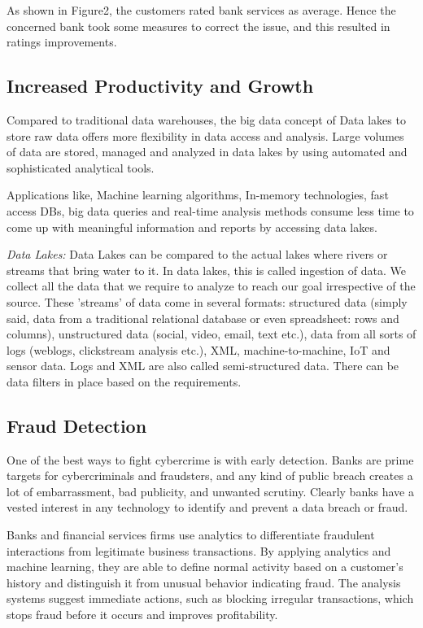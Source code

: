 \documentclass[sigconf]{acmart}
\begin{document}
As shown in Figure2, the customers rated bank services as average. Hence the concerned bank took some measures to correct the issue, and this resulted in ratings improvements.

\subsection{Increased Productivity and Growth}
Compared to traditional data warehouses, the big data concept of Data lakes to store raw data offers more flexibility in data access and analysis. Large volumes of data are stored, managed and analyzed in data lakes  by using automated and sophisticated analytical tools. 

Applications like, Machine learning algorithms, In-memory technologies, fast access DBs, big data queries and real-time analysis methods consume less time to come up with meaningful information and reports by accessing data lakes.

\textit{Data Lakes:} Data Lakes can be compared to the actual lakes where rivers or streams that bring water to it. In data lakes, this is called ingestion of data. We collect all the data that we require to analyze to reach our goal irrespective of the source. These 'streams' of data come in several formats: structured data (simply said, data from a traditional relational database or even spreadsheet: rows and columns), unstructured data (social, video, email, text etc.), data from all sorts of logs (weblogs, clickstream analysis etc.), XML, machine-to-machine, IoT and sensor data. Logs and XML are also called semi-structured data. There can be data filters in place based on the requirements\cite{data-lakes}.

\subsection{Fraud Detection}
One of the best ways to fight cybercrime is with early detection. Banks are prime targets for cybercriminals and fraudsters, and any kind of public breach creates a lot of embarrassment, bad publicity, and unwanted scrutiny. Clearly banks have a vested interest in any technology to identify and prevent a data breach or fraud\cite{the-top-5-trends-for-big-data-in-financial-services}.

Banks and financial services firms use analytics to differentiate fraudulent interactions from legitimate business transactions. By applying analytics and machine learning, they are able to define normal activity based on a customer's history and distinguish it from unusual behavior indicating fraud. The analysis systems suggest immediate actions, such as blocking irregular transactions, which stops fraud before it occurs and improves profitability\cite{5-big-data-use-cases-in-banking-and-financial-services}.
\end{document}
